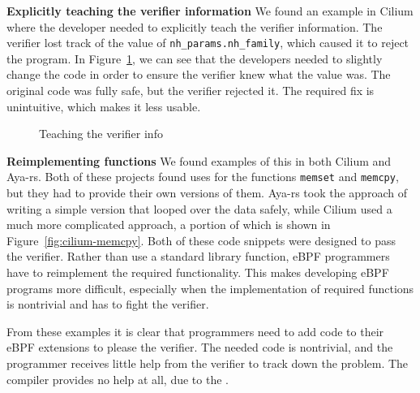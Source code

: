 \noindent\textbf{Explicitly teaching the verifier information}
We found an example in Cilium where the developer needed to explicitly teach the verifier
    information.
The verifier lost track of the value of \texttt{nh\_params.nh\_family}, which caused it to reject the program.
In Figure~\ref{fig:teach-verifier}, we can see that the developers needed to slightly change the code in order to ensure the verifier knew what the value was.
The original code was fully safe, but the verifier rejected it.
The required fix is unintuitive, which makes it less usable.

\begin{figure}
    
    \vspace{-10pt}
    \caption{Teaching the verifier info}
    \vspace{-10pt}
    \label{fig:teach-verifier}
\end{figure}

\noindent\textbf{Reimplementing functions}
We found examples of this in both Cilium and Aya-rs.
Both of these projects found uses for the functions \texttt{memset} and \texttt{memcpy}, but they had to provide their own versions of them.
Aya-rs took the approach of writing a simple version that looped over the data safely, while Cilium used a much more complicated approach, a portion of which is shown in Figure~\ref{fig:cilium-memcpy}.
Both of these code snippets were designed to pass the verifier.
Rather than use a standard library function, eBPF programmers have to reimplement the required functionality.
This makes developing eBPF programs more difficult, especially when the implementation of
    required functions is nontrivial and has to fight the verifier.

From these examples it is clear that programmers need to add code to their
    eBPF extensions to please the verifier.
The needed code is nontrivial, and the programmer receives little help from the verifier to track down
    the problem.
The compiler provides no help at all, due to the \gap{}.

